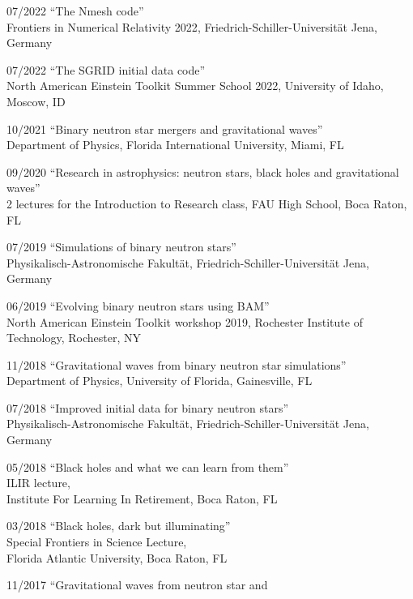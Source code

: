 \documentclass[11pt]{article}
\begin{document}
\begin{list}{}{\leftmargin=5em =1.5em \rightmargin=-8em =7em}
\item[07/2022]	``The Nmesh code''\\
		{Frontiers in Numerical Relativity 2022},
		{Friedrich-Schiller-Universit\"at Jena, Germany}
\item[07/2022]	``The SGRID initial data code''\\
		{North American Einstein Toolkit Summer School 2022},
		{University of Idaho, Moscow, ID}
\item[10/2021]	``Binary neutron star mergers and gravitational waves''\\
		{Department of Physics},
		{Florida International University, Miami, FL}
\item[09/2020]	``Research in astrophysics:
		neutron stars, black holes and gravitational waves''\\
		{2 lectures for the Introduction to Research class},
		{FAU High School, Boca Raton, FL}
\item[07/2019]	``Simulations of binary neutron stars''\\
		{Physikalisch-Astronomische Fakult\"at},
		{Friedrich-Schiller-Universit\"at Jena, Germany}
\item[06/2019]	``Evolving binary neutron stars using BAM''\\
		{North American Einstein Toolkit workshop 2019},
		{Rochester Institute of Technology, Rochester, NY}
\item[11/2018]	``Gravitational waves from binary neutron star simulations''\\
		{Department of Physics},
		{University of Florida, Gainesville, FL}
\item[07/2018]	``Improved initial data for binary neutron stars''\\
		{Physikalisch-Astronomische Fakult\"at},
		{Friedrich-Schiller-Universit\"at Jena, Germany}
\item[05/2018]	``Black holes and what we can learn from them''\\
		{ILIR lecture},\\
		{Institute For Learning In Retirement, Boca Raton, FL}
\item[03/2018]	``Black holes, dark but illuminating''\\
		{Special Frontiers in Science Lecture},\\
		{Florida Atlantic University, Boca Raton, FL}
\item[11/2017]	``Gravitational waves from neutron star and

\end{list}
\end{document}
